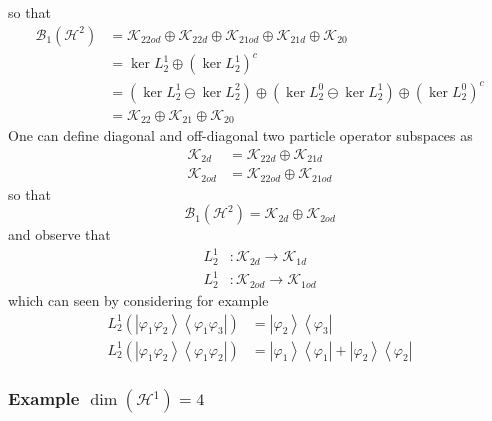 \documentclass[aps,preprint]{revtex4}%
\begin{document}
so that
\begin{align}
\mathcal{B}_{1}\left(  \mathcal{H}^{2}\right)   &  =\mathcal{K}_{22od}%
\oplus\mathcal{K}_{22d}\oplus\mathcal{K}_{21od}\oplus\mathcal{K}_{21d}%
\oplus\mathcal{K}_{20}\nonumber\\
&  =\ker L_{2}^{1}\oplus\left(  \ker L_{2}^{1}\right)  ^{c}\nonumber\\
&  =\left(  \ker L_{2}^{1}\ominus\ker L_{2}^{2}\right)  \oplus\left(  \ker
L_{2}^{0}\ominus\ker L_{2}^{1}\right)  \oplus\left(  \ker L_{2}^{0}\right)
^{c}\nonumber\\
&  =\mathcal{K}_{22}\oplus\mathcal{K}_{21}\oplus\mathcal{K}_{20}%
\end{align}
One can define diagonal and off-diagonal two particle operator subspaces as
\begin{align}
\mathcal{K}_{2d} &  =\mathcal{K}_{22d}\oplus\mathcal{K}_{21d}\nonumber\\
\mathcal{K}_{2od} &  =\mathcal{K}_{22od}\oplus\mathcal{K}_{21od}%
\end{align}
so that
\begin{equation}
\mathcal{B}_{1}\left(  \mathcal{H}^{2}\right)  =\mathcal{K}_{2d}%
\oplus\mathcal{K}_{2od}%
\end{equation}
and observe that
\begin{align}
L_{2}^{1} &  :\mathcal{K}_{2d}\rightarrow\mathcal{K}_{1d}\nonumber\\
L_{2}^{1} &  :\mathcal{K}_{2od}\rightarrow\mathcal{K}_{1od}%
\end{align}
which can seen by considering for example
\begin{align}
L_{2}^{1}\left(  \left\vert \varphi_{1}\varphi_{2}\right\rangle \left\langle
\varphi_{1}\varphi_{3}\right\vert \right)   &  =\left\vert \varphi
_{2}\right\rangle \left\langle \varphi_{3}\right\vert \nonumber\\
L_{2}^{1}\left(  \left\vert \varphi_{1}\varphi_{2}\right\rangle \left\langle
\varphi_{1}\varphi_{2}\right\vert \right)   &  =\left\vert \varphi
_{1}\right\rangle \left\langle \varphi_{1}\right\vert +\left\vert \varphi
_{2}\right\rangle \left\langle \varphi_{2}\right\vert
\end{align}


\subsubsection{Example $\dim\left(  \mathcal{H}^{1}\right)  =4$}
\end{document}
